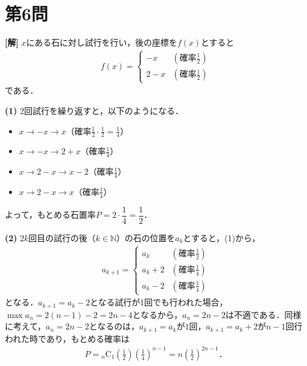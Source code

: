 \documentclass[../main.tex]{subfiles}
\begin{document}
\newpage

\section*{第6問}

{\bf [解]}
$x$にある石に対し試行を行い，後の座標を$f(x)$とすると
\begin{align*}
  f(x)=
  \begin{cases}-x&(\text{確率}\frac12)\\2-x&(\text{確率}\frac12)
  \end{cases}
\end{align*}
である．

\textbf{(1)} 2回試行を繰り返すと，以下のようになる．
\begin{itemize}
  \item $x\to-x\to x$（確率$\frac12\cdot\frac12=\frac14$）
  \item $x\to-x\to2+x$（確率$\frac14$）
  \item $x\to2-x\to x-2$（確率$\frac14$）
  \item $x\to2-x\to x$（確率$\frac14$）
\end{itemize}

よって，もとめる石置率$P=2\cdot\dfrac14=\dfrac12$．

\textbf{(2)} $2k$回目の試行の後（$k\in\mathbb{N}$）の石の位置を$a_k$とすると，(1)から，
\begin{align*}
  a_{k+1}=
  \begin{cases}a_k&(\text{確率}\frac12)\\a_k+2&(\text{確率}\frac14)\\a_k-2&(\text{確率}\frac14)
  \end{cases}
\end{align*}
となる．$a_{k+1}=a_k-2$となる試行が1回でも行われた場合，$\max a_n=2(n-1)-2=2n-4$となるから，$a_n=2n-2$は不適である．同様に考えて，$a_n=2n-2$となるのは，$a_{k+1}=a_k$が$1$回，$a_{k+1}=a_k+2$が$n-1$回行われた時であり，もとめる確率は
\begin{align*}
  P={}_n\mathrm{C}_1\left(\frac12\right)\left(\frac14\right)^{n-1}=n\left(\frac12\right)^{2n-1}．
\end{align*}

\newpage
\end{document}
